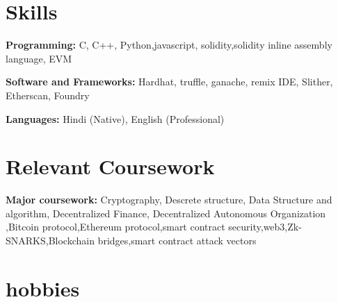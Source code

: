 \documentclass[letterpaper,11pt]{article}
\newcommand{\resumeSubHeadingListStart}{\begin{itemize}[leftmargin=0.15in, label={}]}
\newcommand{\resumeSubHeadingListEnd}{\end{itemize}}
\begin{document}
\section{Skills}
  \vspace{2pt}
  \resumeSubHeadingListStart
    \small{\item{
        \textbf{Programming:}{ C, C++, Python,javascript, solidity,solidity inline assembly language, EVM } \\ \vspace{3pt}

        \textbf{Software and Frameworks:}{ Hardhat, truffle, ganache, 
remix IDE, Slither, Etherscan, Foundry } \\ \vspace{3pt}
        
        
        
        \textbf{Languages:}{ Hindi (Native), English (Professional)}
        
    }}
  \resumeSubHeadingListEnd




\section{Relevant Coursework}
  \vspace{2pt}
  \resumeSubHeadingListStart
    \small{\item{
        \textbf{Major coursework:}{ Cryptography, Descrete structure, Data Structure and algorithm, Decentralized Finance, Decentralized Autonomous Organization ,Bitcoin protocol,Ethereum protocol,smart contract security,web3,Zk-SNARKS,Blockchain bridges,smart contract attack vectors} \\ \vspace{3pt}
        
    }}
  \resumeSubHeadingListEnd




\section{hobbies}
\end{document}
